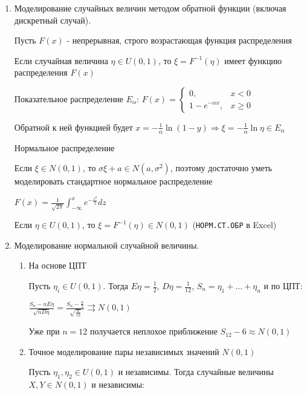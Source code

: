 \documentclass[12pt]{article}
\begin{document}
\begin{enumerate}
    \item Моделирование случайных величин методом обратной функции (включая дискретный случай).

    \begin{MyTheorem}
        \Ths Пусть $F(x)$ - непрерывная, строго возрастающая функция распределения

        Если случайная величина $\eta \in U(0, 1)$, то $\xi = F^{-1}(\eta)$ имеет функцию распределения $F(x)$
    \end{MyTheorem}

    \Ex Показательное распределение $E_\alpha$: $F(x) = \begin{cases}0, & x < 0 \\ 1 - e^{-\alpha x}, & x \geq 0\end{cases}$

    Обратной к ней функцией будет $x = -\frac{1}{\alpha} \ln (1 - y) \Longrightarrow \xi = -\frac{1}{\alpha} \ln \eta \in E_\alpha$

    \Ex Нормальное распределение

    Если $\xi \in N(0, 1)$, то $\sigma \xi + a \in N(a, \sigma^2)$, поэтому достаточно уметь моделировать стандартное нормальное распределение

    $F(x) = \frac{1}{\sqrt{2\pi}} \int_{-\infty}^x e^{-\frac{z^2}{2}} dz$

    Если $\eta \in U(0, 1)$, то $\xi = F^{-1}(\eta) \in N(0, 1)$ (\texttt{НОРМ.СТ.ОБР} в Excel)

    \item Моделирование нормальной случайной величины.

    \begin{enumerate}[label*=\Roman*. ]
        \item На основе ЦПТ

        Пусть $\eta_i \in U(0, 1)$. Тогда $E\eta = \frac{1}{2}$, $D\eta = \frac{1}{12}$, $S_n = \eta_1 + \dots + \eta_n$ и по ЦПТ:

        $\frac{S_n - nE\eta}{\sqrt{n D\eta}} = \frac{S_n - \frac{n}{2}}{\sqrt{\frac{n}{12}}} \rightrightarrows N(0, 1)$

        Уже при $n = 12$ получается неплохое приближение $S_{12} - 6 \approx N(0, 1)$ 

        \item Точное моделирование пары независимых значений $N(0, 1)$

        \begin{MyTheorem}
            Пусть $\eta_1, \eta_2 \in U(0, 1)$ и независимы. Тогда случайные величины $X, Y \in N(0, 1)$ и независимы:


\end{MyTheorem}
\end{enumerate}
\end{enumerate}
\end{document}
